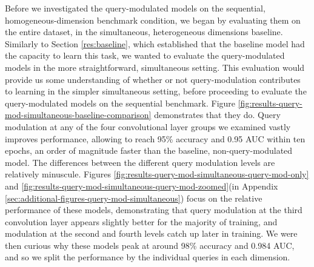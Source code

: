 Before we investigated the query-modulated models on the sequential, homogeneous-dimension benchmark condition, we began by evaluating them on the entire dataset, in the simultaneous, heterogeneous dimensions baseline. Similarly to Section \ref{res:baseline}, which established that the baseline model had the capacity to learn this task, we wanted to evaluate the query-modulated models in the more straightforward, simultaneous setting. This evaluation would provide us some understanding of whether or not query-modulation contributes to learning in the simpler simultaneous setting, before proceeding to evaluate the query-modulated models on the sequential benchmark. Figure \ref{fig:results-query-mod-simultaneous-baseline-comparison} demonstrates that they do. Query modulation at any of the four convolutional layer groups we examined vastly improves performance, allowing to reach 95\% accuracy and 0.95 AUC within ten epochs, an order of magnitude faster than the baseline, non-query-modulated model. The differences between the different query modulation levels are relatively minuscule. Figures \ref{fig:results-query-mod-simultaneous-query-mod-only} and \ref{fig:results-query-mod-simultaneous-query-mod-zoomed}(in Appendix \ref{sec:additional-figures-query-mod-simultaneous}) focus on the relative performance of these models, demonstrating that query modulation at the third convolution layer appears slightly better for the majority of training, and modulation at the second and fourth levels catch up later in training. We were then curious why these models peak at around 98\% accuracy and 0.984 AUC, and so we split the performance by the individual queries in each dimension.


